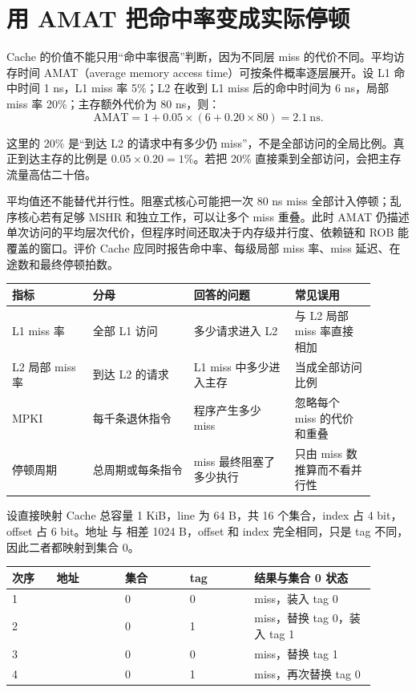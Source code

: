 \section{用 AMAT 把命中率变成实际停顿}

Cache 的价值不能只用“命中率很高”判断，因为不同层 miss 的代价不同。平均访存时间 AMAT（average memory access time）可按条件概率逐层展开。设 L1 命中时间 1 ns，L1 miss 率 5\%；L2 在收到 L1 miss 后的命中时间为 6 ns，局部 miss 率 20\%；主存额外代价为 80 ns，则：
\[
\mathrm{AMAT}=1+0.05\times(6+0.20\times80)=2.1\ \mathrm{ns}.
\]

这里的 20\% 是“到达 L2 的请求中有多少仍 miss”，不是全部访问的全局比例。真正到达主存的比例是 $0.05\times0.20=1\%$。若把 20\% 直接乘到全部访问，会把主存流量高估二十倍。

平均值还不能替代并行性。阻塞式核心可能把一次 80 ns miss 全部计入停顿；乱序核心若有足够 MSHR 和独立工作，可以让多个 miss 重叠。此时 AMAT 仍描述单次访问的平均层次代价，但程序时间还取决于内存级并行度、依赖链和 ROB 能覆盖的窗口。评价 Cache 应同时报告命中率、每级局部 miss 率、miss 延迟、在途数和最终停顿拍数。

\begin{longtable}{L{0.20\linewidth}L{0.25\linewidth}L{0.25\linewidth}L{0.20\linewidth}}
\toprule
指标 & 分母 & 回答的问题 & 常见误用 \\
\midrule
L1 miss 率 & 全部 L1 访问 & 多少请求进入 L2 & 与 L2 局部 miss 率直接相加 \\
L2 局部 miss 率 & 到达 L2 的请求 & L1 miss 中多少进入主存 & 当成全部访问比例 \\
MPKI & 每千条退休指令 & 程序产生多少 miss & 忽略每个 miss 的代价和重叠 \\
停顿周期 & 总周期或每条指令 & miss 最终阻塞了多少执行 & 只由 miss 数推算而不看并行性 \\
\bottomrule
\end{longtable}


设直接映射 Cache 总容量 1 KiB，line 为 64 B，共 16 个集合，index 占 4 bit，offset 占 6 bit。地址  与  相差 1024 B，offset 和 index 完全相同，只是 tag 不同，因此二者都映射到集合 0。

\begin{longtable}{L{0.11\linewidth}L{0.17\linewidth}L{0.16\linewidth}L{0.16\linewidth}L{0.30\linewidth}}
\toprule
次序 & 地址 & 集合 & tag & 结果与集合 0 状态 \\
 &  & 0 & 0 & miss，装入 tag 0 \\
2 &  & 0 & 1 & miss，替换 tag 0，装入 tag 1 \\
3 &  & 0 & 0 & miss，替换 tag 1 \\
4 &  & 0 & 1 & miss，再次替换 tag 0 \\
\bottomrule
\end{longtable}

